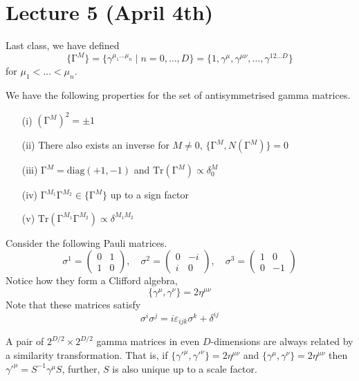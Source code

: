 \section{Lecture 5 (April 4th)}
\begin{recall}
Last class, we have defined 
\[\{\mathrm{\Gamma} ^{M}\}=\{\gamma ^{\mu_1\ldots \mu _{n}}\;|\;n=0,\ldots ,D\}=\{1,\gamma ^{\mu},\gamma ^{\mu \nu },\ldots ,\gamma ^{12\ldots D}\}\]
for $\mu_1<\ldots <\mu _{n}$.
\end{recall}
\vspace{2ex}
\begin{thm}
We have the following properties for the set of antisymmetrised gamma matrices. 
\begin{itemize}
\item[(i)] $(\mathrm{\Gamma}^{M})^2=\pm 1$
\item[(ii)] There also exists an inverse for $M\ne 0$, 
$\{\mathrm{\Gamma} ^{M},N(\mathrm{\Gamma} ^{M})\}=0$
\item[(iii)] $\mathrm{\Gamma} ^{M}=\mathrm{diag}(+1,-1)$ and $\mathrm{Tr}(\mathrm{\Gamma} ^{M})\propto \delta ^{M}_{0}$
\item[(iv)] $\mathrm{\Gamma} ^{M_1}\mathrm{\Gamma} ^{M_2}\in \{\mathrm{\Gamma} ^{M}\}$ up to a sign factor
\item[(v)] $\mathrm{Tr}(\mathrm{\Gamma} ^{M_1}\mathrm{\Gamma} ^{M_2})\propto\delta ^{M_1M_2}$
\end{itemize}
\end{thm}
\vspace{2ex}
\begin{rmk}
Consider the following Pauli matrices.
\[
\sigma^1 = \begin{pmatrix}
0 & 1 \\
1 & 0
\end{pmatrix}, \quad
\sigma^2 = \begin{pmatrix}
0 & -i \\
i & 0
\end{pmatrix}, \quad
\sigma^3 = \begin{pmatrix}
1 & 0 \\
0 & -1
\end{pmatrix}
\]
Notice how they form a Clifford algebra,
\[\{\gamma ^{\mu },\gamma ^{\nu }\}=2\eta ^{\mu \nu }\]
Note that these matrices satisfy
\[\sigma ^{i}\sigma ^{j}=i\varepsilon _{ijk}\sigma ^{k}+\delta ^{ij}\]
\end{rmk}
\vspace{2ex}
\begin{thm}
A pair of $2^{D/2}\times 2^{D/2}$ gamma matrices in even $D$-dimensions are always related by a similarity transformation. That is, if $\{\gamma'^{\mu },\gamma'^{\nu }\}=2\eta ^{\mu \nu }$ and $\{\gamma ^{\mu },\gamma ^{\nu }\}=2\eta ^{\mu \nu }$ then $\gamma'^{\mu }=S^{-1}\gamma ^{\mu }S $, further, $S$ is also unique up to a scale factor.
\end{thm}
